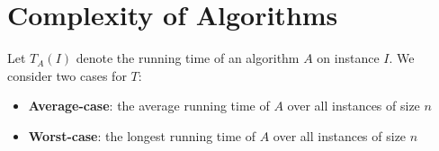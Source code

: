 \documentclass{report}
\begin{document}
\section{Complexity of Algorithms}
Let $T_A(I)$ denote the running time of an algorithm $A$ on instance $I$. We consider two cases for $T$:
\begin{itemize}
\item \textbf{Average-case}: the average running time of $A$ over all instances of size $n$
\item \textbf{Worst-case}: the longest running time of $A$ over all instances of size $n$
\end{itemize}
\end{document}
